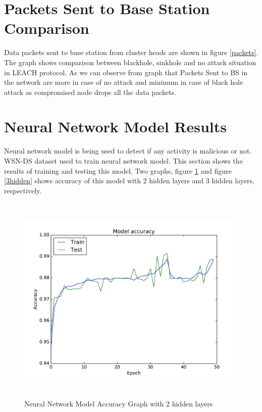 \section{Packets Sent to Base Station Comparison}
Data packets sent to base station from cluster heads are shown in figure \ref{packets}. The graph shows comparison between blackhole, sinkhole and no attack situation in LEACH protocol. As we can observe from graph that Packets Sent to BS in the network are more in case of no attack and minimum in case of black hole attack as compromised node drops all the data packets.

\section{Neural Network Model Results}
\label{NNresults}
Neural network model is being used to detect if any activity is malicious or not. WSN-DS dataset used to train neural network model. This section shows the results of training and testing this model. Two graphs, figure \ref{2hidden} and figure \ref{3hidden} shows accuracy of this model with 2 hidden layers and 3 hidden layers, respectively.
\begin{figure}[hbp]
    \centering
    \includegraphics[width=5.5in, height=4in] {Figures/PDF/2hidden.pdf}
    \caption{Neural Network Model Accuracy Graph with 2 hidden layers}
    \label{2hidden}
\end{figure}

